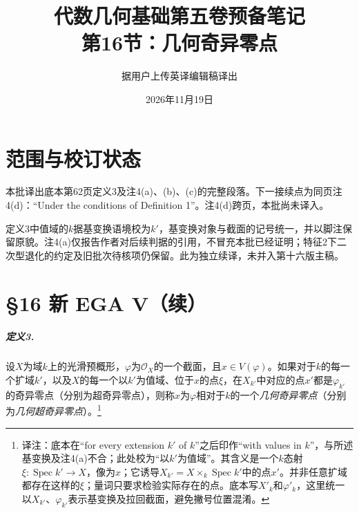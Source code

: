 \documentclass[openany,fontset=fandol]{ctexbook}
\newcommand{\note}[1]{\unskip\nobreak\footnote{译注：#1}}
\begin{document}
\title{代数几何基础第五卷预备笔记\\第16节：几何奇异零点}
\author{据用户上传英译编辑稿译出}
\date{2026年11月19日}
\maketitle
\chapter*{范围与校订状态}
本批译出底本第62页定义3及注4(a)、(b)、(c)的完整段落。下一接续点为同页注4(d)：“Under the conditions of Definition 1”。注4(d)跨页，本批尚未译入。

定义3中值域的$k$据基变换语境校为$k'$，基变换对象与截面的记号统一，并以脚注保留原貌。注4(a)仅报告作者对后续判据的引用，不冒充本批已经证明；特征2下二次型退化的约定及旧批次待核项仍保留。此为独立续译，未并入第十六版主稿。
\chapter*{§16 新 EGA V（续）}
\enlargethispage{3\baselineskip}
\paragraph{定义3.}
设$X$为域$k$上的光滑预概形，$\varphi$为$\mathcal O_X$的一个截面，且$x\in V(\varphi)$。如果对于$k$的每一个扩域$k'$，以及$X$的每一个以$k'$为值域、位于$x$的点$\xi$，在$X_{k'}$中对应的点$x'$都是$\varphi_{k'}$的奇异零点（分别为超奇异零点），则称$x$为$\varphi$相对于$k$的一个\emph{几何奇异零点}（分别为\emph{几何超奇异零点}）。\note{底本在“for every extension $k'$ of $k$”之后印作“with values in $k$”，与所述基变换及注4(a)不合；此处校为“以$k'$为值域”。其含义是一个$k$态射$\xi:\operatorname{Spec}k'\to X$，像为$x$；它诱导$X_{k'}=X\times_k\operatorname{Spec}k'$中的点$x'$。并非任意扩域都存在这样的$\xi$；量词只要求检验实际存在的点。底本写$X'_k$和$\varphi'_k$，这里统一以$X_{k'}$、$\varphi_{k'}$表示基变换及拉回截面，避免撇号位置混淆。}
\end{document}
